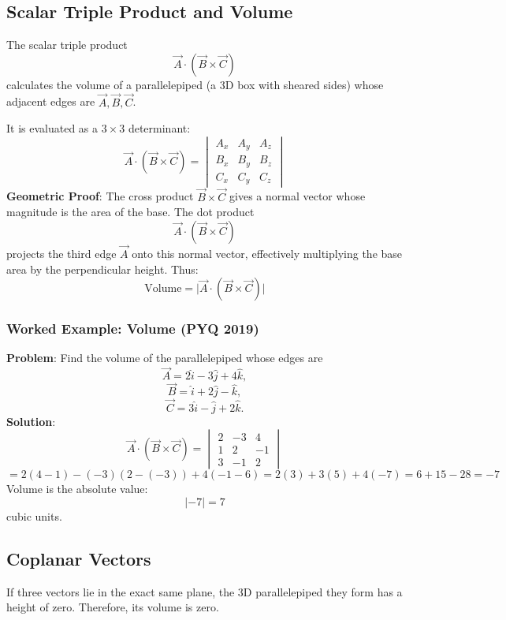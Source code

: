 \documentclass[
]{article}
\begin{document}
\subsection{Scalar Triple Product and
Volume}\label{scalar-triple-product-and-volume}

The scalar triple product
\[
\vec{A} \cdot (\vec{B} \times \vec{C})
\]
calculates the volume of a parallelepiped (a 3D box with sheared sides)
whose adjacent edges are \(\vec{A}, \vec{B}, \vec{C}\).

It is evaluated as a \(3 \times 3\) determinant:
\[
\vec{A} \cdot (\vec{B} \times \vec{C}) =
\begin{vmatrix}
A_x & A_y & A_z \\
B_x & B_y & B_z \\
C_x & C_y & C_z
\end{vmatrix}
\]
\textbf{Geometric Proof}: The cross product \(\vec{B} \times \vec{C}\)
gives a normal vector whose magnitude is the area of the base. The dot
product
\[
\vec{A} \cdot (\vec{B} \times \vec{C})
\]
projects the third edge \(\vec{A}\) onto this normal vector, effectively
multiplying the base area by the perpendicular height. Thus:
\[
\text{Volume} = \lvert \vec{A} \cdot (\vec{B} \times \vec{C}) \rvert
\]
\subsubsection{Worked Example: Volume (PYQ
2019)}\label{worked-example-volume-pyq-2019}

\textbf{Problem}: Find the volume of the parallelepiped whose edges are
\[
\vec{A} = 2\hat{i} - 3\hat{j} + 4\hat{k},
\]
\[
\vec{B} = \hat{i} + 2\hat{j} - \hat{k},
\]
\[
\vec{C} = 3\hat{i} - \hat{j} + 2\hat{k}.
\]
\textbf{Solution}:
\[
\vec{A} \cdot (\vec{B} \times \vec{C}) =
\begin{vmatrix}
2 & -3 & 4 \\
1 & 2 & -1 \\
3 & -1 & 2
\end{vmatrix}
\]
\[
= 2(4 - 1) - (-3)(2 - (-3)) + 4(-1 - 6) = 2(3) + 3(5) + 4(-7) = 6 + 15 - 28 = -7
\]
Volume is the absolute value:
\[
\lvert -7 \rvert = 7
\]
cubic units.

\subsection{Coplanar Vectors}\label{coplanar-vectors}

If three vectors lie in the exact same plane, the 3D parallelepiped they
form has a height of zero. Therefore, its volume is zero.
\end{document}
